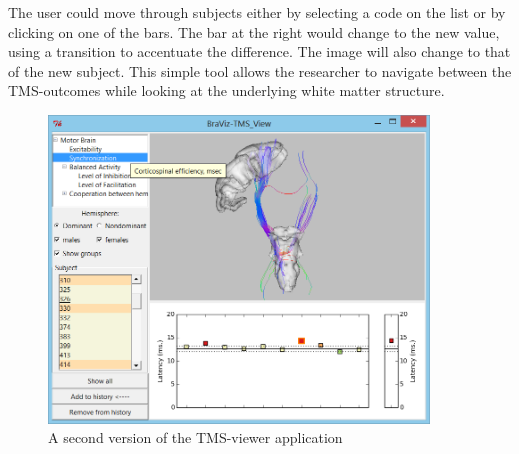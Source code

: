 The user could move through subjects either by selecting a code on the list or by clicking on one of the bars. The bar at the right would change to the new value, using a transition to accentuate the difference. The image will also change to that of the new subject. This simple tool allows the researcher to navigate between the TMS-outcomes while looking at the underlying white matter structure. 

\begin{figure}
	\centering
		\includegraphics[width=0.90\textwidth]{figures/analysis/tms_view_motor}
	\caption{A second version of the TMS-viewer application}
	\label{fig_tms_view_second}
\end{figure}

